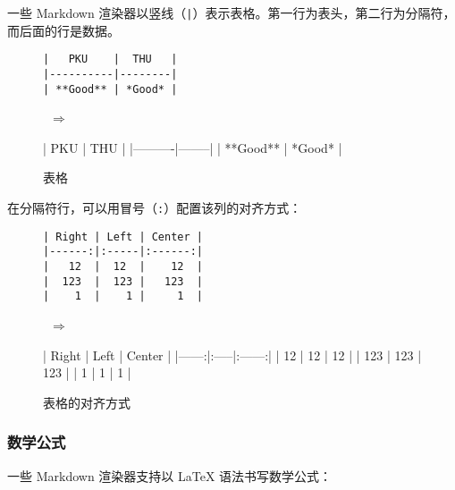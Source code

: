 \documentclass[a4paper,fontset=none]{ctexart}
\begin{document}
一些 Markdown 渲染器以竖线（\verb/|/）表示表格。第一行为表头，第二行为分隔符，而后面的行是数据。

\begin{figure}[H]
    \centering
    \begin{minipage}{0.45\textwidth}
        \begin{verbatim}
|   PKU    |  THU   |
|----------|--------|
| **Good** | *Good* |
        \end{verbatim}
    \end{minipage}
    \, $\Longrightarrow$ \,
    \begin{minipage}{0.45\textwidth}
\begin{markdown}
|   PKU    |  THU   |
|----------|--------|
| **Good** | *Good* |
\end{markdown}
    \end{minipage}
    \caption{表格}
\end{figure}

在分隔符行，可以用冒号（\verb|:|）配置该列的对齐方式：

\begin{figure}[H]
    \centering
    \begin{minipage}{0.45\textwidth}
        \begin{verbatim}
| Right | Left | Center |
|------:|:-----|:------:|
|   12  |  12  |    12  |
|  123  |  123 |   123  |
|    1  |    1 |     1  |
        \end{verbatim}
    \end{minipage}
    \, $\Longrightarrow$ \,
    \begin{minipage}{0.45\textwidth}
\begin{markdown}
| Right | Left | Center |
|------:|:-----|:------:|
|   12  |  12  |    12  |
|  123  |  123 |   123  |
|    1  |    1 |     1  |
\end{markdown}
    \end{minipage}
    \caption{表格的对齐方式}
\end{figure}

\subsubsection{数学公式}

一些 Markdown 渲染器支持以 LaTeX 语法书写数学公式：
\end{document}
